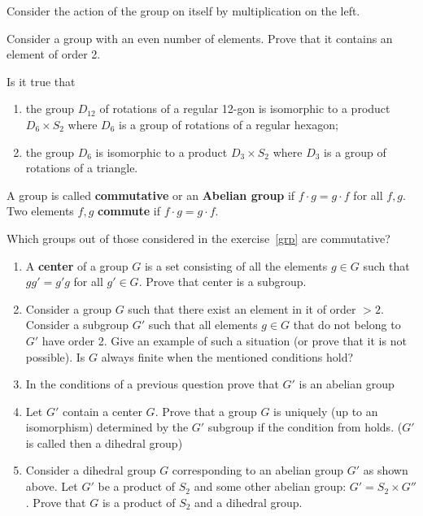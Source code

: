 \documentclass[12pt]{article}
\begin{document}
\begin{ukazanie}
Consider the action of the group on itself by multiplication on the
left.
\end{ukazanie}

\begin{zadacha}[*]
  Consider a group with an even number of elements. Prove that it
  contains an element of order 2.
\end{zadacha}

\begin{zadacha}[*]
  Is it true that
\begin{enumerate}
\item the group $D_{12}$ of rotations of a regular 12-gon is
  isomorphic to a product $D_{6}\times S_2$ where $D_6$ is a group of
  rotations of a regular hexagon;
\item the group $D_6$ is isomorphic to a product $D_{3}\times S_2$
  where $D_3$ is a group of rotations of a triangle.
\end{enumerate}
\end{zadacha}

A group is called {\bf commutative} or an {\bf Abelian group} if
$f\cdot g = g \cdot f$ for all $f, g$. Two elements $f, g$ {\bf
  commute} if $f\cdot g = g \cdot f$.

\begin{zadacha}
Which groups out of those considered in the exercise~\ref{grp} are
commutative?
\end{zadacha}

\begin{zadacha}[*]
\begin{enumerate}

\item 
A {\bf center} of a group $G$ is a set consisting of all the elements
$g\in G$ such that $g g' = g' g$ for all $g'\in G$. Prove that center
is a subgroup.

\item Consider a group $G$ such that there exist an element in it of
  order $>2$. Consider a subgroup $G'$ such that all elements $g\in G$
  that do not belong to $G'$ have order 2. Give an example of such a
  situation (or prove that it is not possible). Is $G$ always finite
  when the mentioned conditions hold?\label{pa}

\item In the conditions of a previous question prove that $G'$ is an
  abelian group

\item Let $G'$ contain a center $G$. Prove that a group $G$ is
  uniquely (up to an isomorphism) determined by the $G'$ subgroup if
  the condition from \thetag{\ref{pa}} holds. ($G'$ is called then a
  dihedral group)

\item Consider a dihedral group $G$ corresponding to an abelian group
$G'$ as shown above. Let $G'$ be a product of $S_2$ and some other
abelian group: $G' = S_2 \times G''$. Prove that $G$ is a product of
$S_2$ and a dihedral group.
\end{enumerate}
\end{zadacha}
\end{document}
